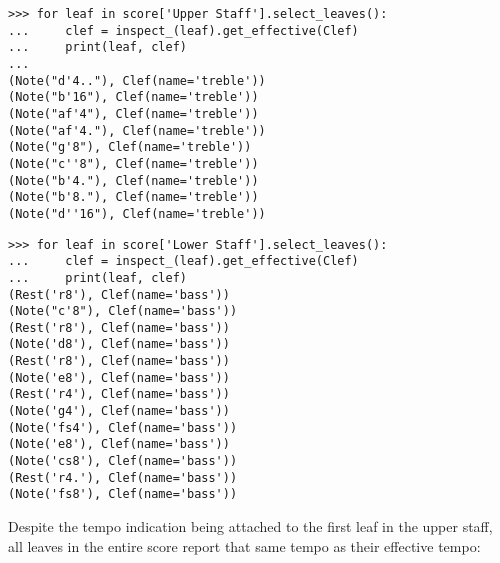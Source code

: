 \begin{abjadbookoutput}
\begin{singlespacing}
\vspace{-0.5\baselineskip}
\begin{lstlisting}
>>> for leaf in score['Upper Staff'].select_leaves():
...     clef = inspect_(leaf).get_effective(Clef)
...     print(leaf, clef)
...
(Note("d'4.."), Clef(name='treble'))
(Note("b'16"), Clef(name='treble'))
(Note("af'4"), Clef(name='treble'))
(Note("af'4."), Clef(name='treble'))
(Note("g'8"), Clef(name='treble'))
(Note("c''8"), Clef(name='treble'))
(Note("b'4."), Clef(name='treble'))
(Note("b'8."), Clef(name='treble'))
(Note("d''16"), Clef(name='treble'))
\end{lstlisting}
\begin{lstlisting}
>>> for leaf in score['Lower Staff'].select_leaves():
...     clef = inspect_(leaf).get_effective(Clef)
...     print(leaf, clef)
(Rest('r8'), Clef(name='bass'))
(Note("c'8"), Clef(name='bass'))
(Rest('r8'), Clef(name='bass'))
(Note('d8'), Clef(name='bass'))
(Rest('r8'), Clef(name='bass'))
(Note('e8'), Clef(name='bass'))
(Rest('r4'), Clef(name='bass'))
(Note('g4'), Clef(name='bass'))
(Note('fs4'), Clef(name='bass'))
(Note('e8'), Clef(name='bass'))
(Note('cs8'), Clef(name='bass'))
(Rest('r4.'), Clef(name='bass'))
(Note('fs8'), Clef(name='bass'))
\end{lstlisting}
\end{singlespacing}
\end{abjadbookoutput}

\noindent Despite the tempo indication being attached to the first leaf in the
upper staff, all leaves in the entire score report that same tempo as their
effective tempo:

\begin{comment}
<abjad>
for leaf in score['Upper Staff'].select_leaves():
    tempo = inspect_(leaf).get_effective(Tempo)
    print(leaf, tempo)

for leaf in score['Lower Staff'].select_leaves():
    tempo = inspect_(leaf).get_effective(Tempo)
    print(leaf, tempo)

</abjad>
\end{comment}

